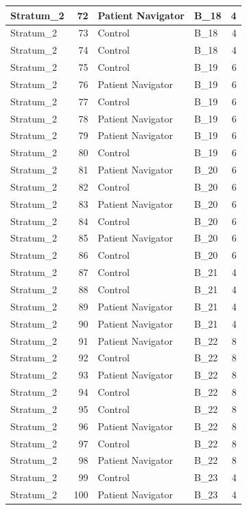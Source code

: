 \documentclass[
]{book}
\begin{document}
\begin{table}[H]
\begin{tabular}{l|r|l|l|r}
\hline
Stratum\_2 & 72 & Patient Navigator & B\_18 & 4\\
\hline
Stratum\_2 & 73 & Control & B\_18 & 4\\
\hline
Stratum\_2 & 74 & Control & B\_18 & 4\\
\hline
Stratum\_2 & 75 & Control & B\_19 & 6\\
\hline
Stratum\_2 & 76 & Patient Navigator & B\_19 & 6\\
\hline
Stratum\_2 & 77 & Control & B\_19 & 6\\
\hline
Stratum\_2 & 78 & Patient Navigator & B\_19 & 6\\
\hline
Stratum\_2 & 79 & Patient Navigator & B\_19 & 6\\
\hline
Stratum\_2 & 80 & Control & B\_19 & 6\\
\hline
Stratum\_2 & 81 & Patient Navigator & B\_20 & 6\\
\hline
Stratum\_2 & 82 & Control & B\_20 & 6\\
\hline
Stratum\_2 & 83 & Patient Navigator & B\_20 & 6\\
\hline
Stratum\_2 & 84 & Control & B\_20 & 6\\
\hline
Stratum\_2 & 85 & Patient Navigator & B\_20 & 6\\
\hline
Stratum\_2 & 86 & Control & B\_20 & 6\\
\hline
Stratum\_2 & 87 & Control & B\_21 & 4\\
\hline
Stratum\_2 & 88 & Control & B\_21 & 4\\
\hline
Stratum\_2 & 89 & Patient Navigator & B\_21 & 4\\
\hline
Stratum\_2 & 90 & Patient Navigator & B\_21 & 4\\
\hline
Stratum\_2 & 91 & Patient Navigator & B\_22 & 8\\
\hline
Stratum\_2 & 92 & Control & B\_22 & 8\\
\hline
Stratum\_2 & 93 & Patient Navigator & B\_22 & 8\\
\hline
Stratum\_2 & 94 & Control & B\_22 & 8\\
\hline
Stratum\_2 & 95 & Control & B\_22 & 8\\
\hline
Stratum\_2 & 96 & Patient Navigator & B\_22 & 8\\
\hline
Stratum\_2 & 97 & Control & B\_22 & 8\\
\hline
Stratum\_2 & 98 & Patient Navigator & B\_22 & 8\\
\hline
Stratum\_2 & 99 & Control & B\_23 & 4\\
\hline
Stratum\_2 & 100 & Patient Navigator & B\_23 & 4\\

\end{tabular}
\end{table}
\end{document}
